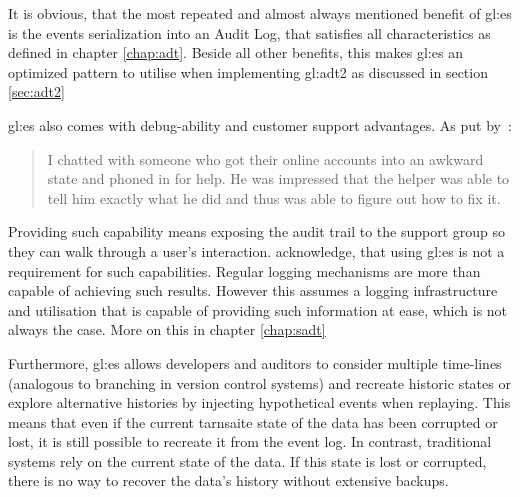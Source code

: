 It is obvious, that the most repeated and almost always mentioned benefit of \gls{gl:es} is the events serialization into an Audit Log, that satisfies all characteristics as defined in chapter \ref{chap:adt}. Beside all other benefits, this makes \gls{gl:es} an optimized pattern to utilise when implementing \gls{gl:adt2} as discussed in section \ref{sec:adt2}

\gls{gl:es} also comes with debug-ability and customer support advantages. As put by~\citep{fowleres}:

\begin{quote}
  I chatted with someone who got their online accounts into an awkward state and phoned in for help. He was impressed that the helper was able to tell him exactly what he did and thus was able to figure out how to fix it.
\end{quote}

Providing such capability means exposing the audit trail to the support group so they can walk through a user's interaction. \citep{fowleres} acknowledge, that using \gls{gl:es} is not a requirement for such capabilities. Regular logging mechanisms are more than capable of achieving such results. However this assumes a logging infrastructure and utilisation that is capable of providing such information at ease, which is not always the case. More on this in chapter \ref{chap:sadt}

Furthermore, \gls{gl:es} allows developers and auditors to consider multiple time-lines (analogous to branching in version control systems) and recreate historic states or explore alternative histories by injecting hypothetical events when replaying. This means that even if the current tarnsaite state of the data has been corrupted or lost, it is still possible to recreate it from the event log. In contrast, traditional systems rely on the current state of the data. If this state is lost or corrupted, there is no way to recover the data's history without extensive backups.



